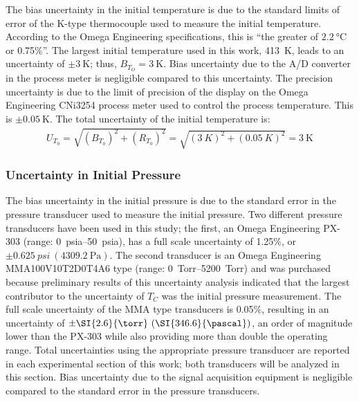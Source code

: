\documentclass[../main.tex]{subfiles}
\begin{document}
The bias uncertainty in the initial temperature is due to the standard
limits of error of the K-type thermocouple used to measure the
initial temperature. According to the Omega Engineering
specifications, this is ``the greater
of $\SI{2.2}{\degreeCelsius}$ or 0.75\%''. The largest initial temperature
used in this work, \SI{413}{\kelvin}, leads to an uncertainty of
$\pm \SI{3}{\kelvin}$; thus, $B_{T_O}=\SI{3}{\kelvin}$. Bias uncertainty
due to the A/D converter in the process meter is negligible compared
to this uncertainty.
The precision uncertainty is due to the limit of precision of
the display on the Omega Engineering CNi3254 process meter used
to control the process temperature. This is $\pm\SI{0.05}{\kelvin}$.
The total uncertainty of the initial temperature is:
%
\begin{align}
U_{T_0} = \sqrt{\left(B_{T_0}\right)^2 + \left(R_{T_0}\right)^2} = \sqrt{\left(\SI{3}{K}\right)^2 + \left(\SI{0.05}{K}\right)^2} = \SI{3}{\kelvin}
\end{align}

\subsubsection{Uncertainty in Initial Pressure}
\label{sec:unc-p0}

The bias uncertainty in the initial pressure is due to the
standard error in the pressure transducer used to measure
the initial pressure. Two different pressure transducers have
been used in this study; the first, an Omega Engineering PX-303
(range: \SIrange{0}{50}{psia}), has a full scale uncertainty of 1.25\%, or
$\pm \SI{0.625}{psi} \ (\SI{4309.2}{\pascal})$. The second transducer is an
Omega Engineering MMA100V10T2D0T4A6 type (range: \SIrange{0}{5200}{Torr}) and was
purchased because preliminary results of this uncertainty analysis
indicated that the largest contributor to the uncertainty of $T_C$ was
the initial pressure measurement. The full scale uncertainty of the MMA
type transducers is 0.05\%, resulting in an uncertainty of
$\pm \SI{2.6}{\torr} \ (\SI{346.6}{\pascal})$, an order of magnitude lower than
the PX-303 while also providing more than double the operating range. Total
uncertainties using the appropriate pressure transducer are reported in
each experimental section of this work; both transducers will be analyzed
in this section. Bias uncertainty due to the signal acquisition equipment
is negligible compared to the standard error in the pressure transducers.
\end{document}
